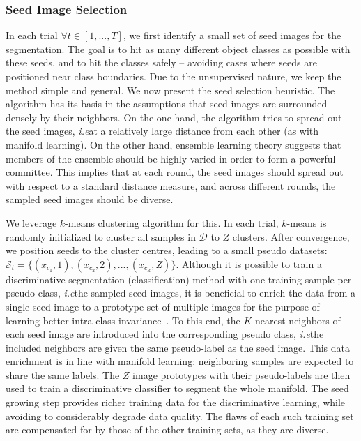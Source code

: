 \documentclass{bmvc2k}
\def\ie{\emph{i.e}\bmvaOneDot}
\begin{document}
\subsubsection{Seed Image Selection}
\label{sec:seeds}

In each trial $\forall t \in [1,...,T]$, we first identify a 
small set of seed images for the segmentation. The goal is to hit as 
many different object classes as possible with these seeds, and to hit the classes safely -- avoiding cases where seeds are
positioned near class boundaries.
Due to the unsupervised nature, we keep the method simple and general. 
We now present the seed selection heuristic.
The algorithm has its basis in the assumptions that seed images 
are surrounded densely by their neighbors.  
On the one hand, the algorithm tries to spread out the seed images, 
\ie at a relatively large distance from each other (as with manifold 
learning). On the other hand, ensemble learning theory suggests that 
members of the ensemble should be highly varied in order to form a 
powerful committee. This implies that at each round, the seed
images should spread out with respect to a standard distance
measure, and across different rounds, the sampled seed images
should be diverse. 





We leverage $k$-means clustering algorithm for this. In each trial, $k$-means is randomly initialized to cluster all samples in $\mathcal{D}$ to $Z$ clusters. After convergence, we position seeds to the cluster centres, leading to a small pseudo datasets: $\mathcal{S}_t=\{(x_{c_1},1), (x_{c_2},2), ..., (x_{c_Z}, Z)\}$. 
Although it is possible to train a discriminative
segmentation (classification) method with one training sample per
pseudo-class, \ie the sampled seed images, it is beneficial to enrich
the data from a single seed image to a prototype set of multiple images 
for the purpose of learning better intra-class
invariance~\cite{singh2012unsupervised,dai:ensemble:eccv12,DFB16}. To this end, the $K$
nearest neighbors of each seed image are introduced into the
corresponding pseudo class, \ie the included neighbors are given the
same pseudo-label as the seed image. This data enrichment is in line
with manifold learning: neighboring samples are expected to
share the same labels. The $Z$ image prototypes with their pseudo-labels
are then used to train a discriminative classifier to segment the
whole manifold. The seed growing step provides richer
training data for the discriminative learning, while avoiding to
considerably degrade data quality. The flaws of each such training
set are compensated for by those of the other training sets, as 
they are diverse.
\end{document}
